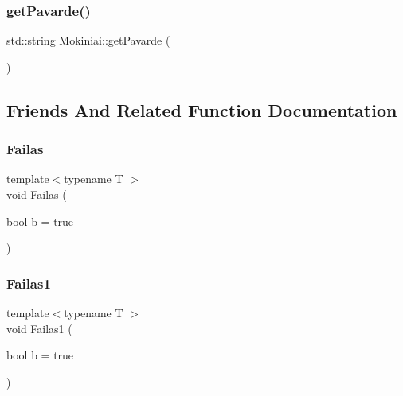 \mbox{\label{class_mokiniai_a50c74d525d0b2e381b1a7013d1d350e4}} 
\subsubsection{\texorpdfstring{get\+Pavarde()}{getPavarde()}}
{\footnotesize\ttfamily std\+::string Mokiniai\+::get\+Pavarde (\begin{DoxyParamCaption}{ }\end{DoxyParamCaption})\hspace{0.3cm}{\ttfamily [inline]}}



\subsection{Friends And Related Function Documentation}
\mbox{\label{class_mokiniai_af9a93fbf8962c85921db2e34cdb12b74}} 
\subsubsection{\texorpdfstring{Failas}{Failas}}
{\footnotesize\ttfamily template$<$typename T $>$ \\
void Failas (\begin{DoxyParamCaption}\item[{bool}]{b = {\ttfamily true} }\end{DoxyParamCaption})\hspace{0.3cm}{\ttfamily [friend]}}

\mbox{\label{class_mokiniai_afdc65dddf430f261a0221df422c76be4}} 
\subsubsection{\texorpdfstring{Failas1}{Failas1}}
{\footnotesize\ttfamily template$<$typename T $>$ \\
void Failas1 (\begin{DoxyParamCaption}\item[{bool}]{b = {\ttfamily true} }\end{DoxyParamCaption})\hspace{0.3cm}{\ttfamily [friend]}}

